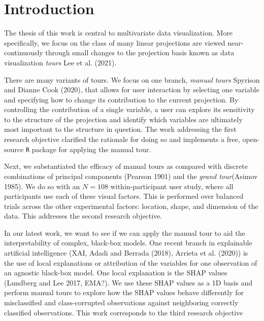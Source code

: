 \documentclass[
  11,
]{article}
\begin{document}
\doublespacing

\newpage
{}
\hypersetup{linkcolor = blue}

{
\hypersetup{linkcolor=}
\setcounter{tocdepth}{2}
\tableofcontents
}
\hypertarget{sec:intro}{%
\section{Introduction}\label{sec:intro}}

The thesis of this work is central to multivariate data visualization. More specifically, we focus on the class of many linear projections are viewed near-continuously through small changes to the projection basis known as data visualization \emph{tours} Lee et al. (2021).

There are many variants of tours. We focus on one branch, \emph{manual tours} Spyrison and Dianne Cook (2020), that allows for user interaction by selecting one variable and specifying how to change its contribution to the current projection. By controlling the contribution of a single variable, a user can explore its sensitivity to the structure of the projection and identify which variables are ultimately most important to the structure in question. The work addressing the first research objective clarified the rationale for doing so and implements a free, open-source \texttt{R} package for applying the manual tour.

Next, we substantiated the efficacy of manual tours as compared with discrete combinations of principal components (Pearson 1901) and the \emph{grand tour}(Asimov 1985). We do so with an \(N=108\) within-participant user study, where all participants use each of these visual factors. This is performed over balanced trials across the other experimental factors: location, shape, and dimension of the data. This addresses the second research objective.

In our latest work, we want to see if we can apply the manual tour to aid the interpretability of complex, black-box models. One recent branch in explainable artificial intelligence (XAI, Adadi and Berrada (2018), Arrieta et al. (2020)) is the use of local explanations or attribution of the variables for one observation of an agnostic black-box model. One local explanation is the SHAP values (Lundberg and Lee 2017, EMA?). We use these SHAP values as a 1D basis and perform manual tours to explore how the SHAP values behave differently for misclassified and class-corrupted observations against neighboring correctly classified observations. This work corresponds to the third research objective
\end{document}
